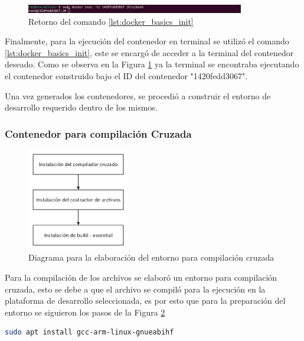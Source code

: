 \begin{figure}[h!]
    \centering
    \includegraphics[width=0.85\textwidth]{fig/especifico_2/retornos_de_comandos/sudo_docker_init.pdf}
    \caption{Retorno del comando \ref{lst:docker_basics_init}}
    \label{fig:sudo_docker_init}
\end{figure}

Finalmente, para la ejecución del contenedor en terminal se utilizó el comando \ref{lst:docker_basics_init}, este se encargó de acceder a la terminal del contenedor deseado. Como se observa en la Figura \ref{fig:sudo_docker_init} ya la terminal se encontraba ejecutando el contenedor construido bajo el ID del contenedor "1420fedd3067".

Una vez generados los contenedores, se procedió a construir el entorno de desarrollo requerido dentro de los mismos.
\newpage

\subsubsection{Contenedor para compilación Cruzada}\label{subsec:generacion_entorno_xcompile}

\begin{figure}[htbp]
    \centering
    \includegraphics[width=0.4\textwidth]{fig/especifico_2/diagrama_compilador_cruzado.pdf}
    \caption{Diagrama para la elaboración del entorno para compilación cruzada}
    \label{fig:cross_compile_diagram}
\end{figure}

Para la compilación de los archivos se elaboró un entorno para compilación cruzada, esto se debe a que el archivo se compiló para la ejecución en la plataforma de desarrollo seleccionada, es por esto que para la preparación del entorno se siguieron los pasos de la Figura \ref{fig:cross_compile_diagram}


\begin{lstlisting}[language=bash, caption={Instalacion del compilador cruzado, Contenedor}, label=lst:cross_compiler]
    sudo apt install gcc-arm-linux-gnueabihf
\end{lstlisting}


